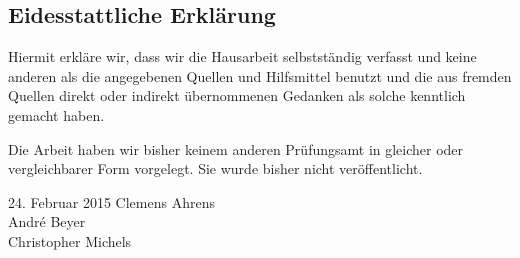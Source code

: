 \subsection*{Eidesstattliche Erklärung}
Hiermit erkläre wir, dass wir die Hausarbeit selbstständig
verfasst und keine anderen als die angegebenen Quellen und Hilfsmittel benutzt
und die aus fremden Quellen direkt oder indirekt übernommenen Gedanken als
solche kenntlich gemacht haben.

Die Arbeit haben wir bisher keinem anderen Prüfungsamt in gleicher oder
vergleichbarer Form vorgelegt. Sie wurde bisher nicht veröffentlicht.


\vspace{3cm}
\begin{center}
24. Februar 2015 \hspace{7.5cm} Clemens Ahrens
\\ \hspace{10.5cm} André Beyer
\\ \hspace{10.5cm} Christopher Michels
\end{center}
